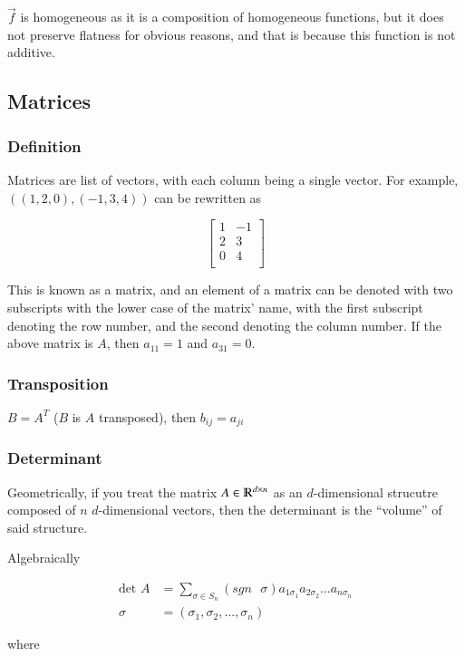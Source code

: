 \documentclass [12 pt, twoside] {book}
\newcommand\+{\text{ }}
\newcommand{\det}{\text{det }}
\begin{document}
$\vec{f}$ is homogeneous as it is a composition of homogeneous functions, but it
does not preserve flatness for obvious reasons, and that is because this
function is not additive.

\subsection{Matrices}
\subsubsection{Definition}
Matrices are list of vectors, with each column being a single vector. For
example, $((1,2,0),(-1, 3, 4))$ can be rewritten as

$$\left[\begin{array}{cc}
    1 & -1\\
    2 & 3\\
    0 & 4\\
\end{array} \right]$$

This is known as a matrix, and an element of a matrix can be denoted with two
subscripts with the lower case of the matrix' name, with the first subscript denoting the row number, and the second denoting the
column number. If the above matrix is $A$, then $a_{11} = 1$ and $a_{31} = 0$.

\subsubsection{Transposition}
$B = A^T$ ($B$ is $A$ transposed), then $b_{ij} = a_{ji}$

\subsubsection{Determinant}

Geometrically, if you treat the matrix $A \in \varmathbb{R}^{d \times n}$ as an
$d$-dimensional strucutre composed of $n$ $d$-dimensional vectors, then the
determinant is the ``volume'' of said structure.

Algebraically

\begin{align*}
    \det A &= \sum_{\sigma \in S_n} (sgn \+ \sigma) a_{1 \sigma_1} a_{2 \sigma_2}
    \dots a_{n\sigma_n}\\
    \sigma &= (\sigma_1, \sigma_2, \dots, \sigma_n)
\end{align*}

where 
\end{document}

